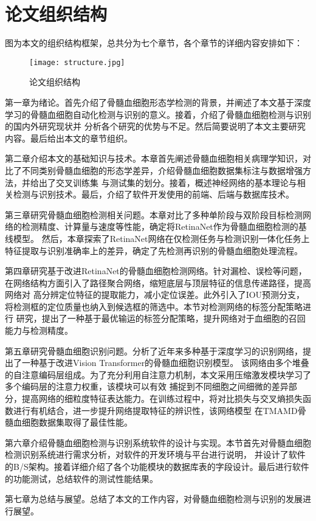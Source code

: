 \section{论文组织结构}
图为本文的组织结构框架，总共分为七个章节，各个章节的详细内容安排如下：

\begin{figure}[h]
    \centering
    \texttt{[image: structure.jpg]}
    \caption{论文组织结构}
    \label{fig:structure}
  \end{figure}
  
第一章为绪论。首先介绍了骨髓血细胞形态学检测的背景，并阐述了本文基于深度学习的骨髓血细胞自动化检测与识别的意义。接着，介绍了骨髓血细胞检测与识别的国内外研究现状并
分析各个研究的优势与不足。然后简要说明了本文主要研究内容。最后给出本文的章节组织。

第二章介绍本文的基础知识与技术。本章首先阐述骨髓血细胞相关病理学知识，对比了不同类别骨髓血细胞的形态学差异，介绍骨髓血细胞数据集标注与数据增强方法，并给出了交叉训练集
与测试集的划分。接着，概述神经网络的基本理论与相关检测与识别技术。最后，介绍了软件开发使用的前端、后端与数据库技术。

第三章研究骨髓血细胞检测相关问题。本章对比了多种单阶段与双阶段目标检测网络的检测精度、计算量与速度等性能，确定将RetinaNet作为骨髓血细胞检测的基线模型。
然后，本章探索了RetinaNet网络在仅检测任务与检测识别一体化任务上特征提取与识别准确率上的差异，确定了先检测再识别的骨髓血细胞处理流程。

第四章研究基于改进RetinaNet的骨髓血细胞检测网络。针对漏检、误检等问题，在网络结构方面引入了路径聚合网络，缩短底层与顶层特征的信息传递路径，提高网络对
高分辨定位特征的提取能力，减小定位误差。此外引入了IOU预测分支，将检测框的定位质量也纳入到候选框的筛选中。本节对检测网络的标签分配策略进行
研究，提出了一种基于最优输运的标签分配策略，提升网络对于血细胞的召回能力与检测精度。

第五章研究骨髓血细胞识别问题。分析了近年来多种基于深度学习的识别网络，提出了一种基于改进Vision Transformer的骨髓血细胞识别模型\cite{SWGC202206005}。
该网络由多个堆叠的自注意编码层组成。为了充分利用自注意力机制，本文采用压缩激发模块学习了多个编码层的注意力权重，该模块可以有效
捕捉到不同细胞之间细微的差异部分，提高网络的细粒度特征表达能力。在训练过程中，将对比损失与交叉熵损失函数进行有机结合，进一步提升网络提取特征的辨识性，该网络模型
在TMAMD骨髓血细胞数据集取得了最佳性能。

第六章介绍骨髓血细胞检测与识别系统软件的设计与实现。本节首先对骨髓血细胞检测识别系统进行需求分析，对软件的开发环境与平台进行说明，
并设计了软件的B/S架构。接着详细介绍了各个功能模块的数据库表的字段设计。最后进行软件的功能测试，总结软件的测试性能结果。

第七章为总结与展望。总结了本文的工作内容，对骨髓血细胞检测与识别的发展进行展望。



